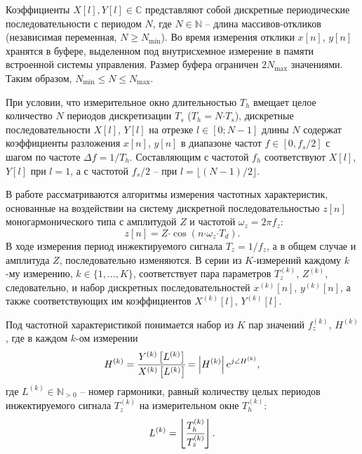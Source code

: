 Коэффициенты ${X\left[l\right], Y\left[l\right] \in \mathbb{C}}$ представляют собой дискретные периодические последовательности с периодом $N$, где ${N \in \mathbb{N}}$ -- длина массивов-откликов (независимая переменная, ${N \geq N_\text{min}}$). Во время измерения отклики ${x[n]}$, ${y[n]}$ хранятся в буфере, выделенном под внутрисхемное измерение в памяти встроенной системы управления. Размер буфера ограничен ${2N_\text{max}}$ значениями. Таким образом, ${N_\text{min}} \leq N \leq N_\text{max}$.

При условии, что измерительное окно длительностью ${T_{h}}$ вмещает целое количество $N$ периодов дискретизации ${T_{s}}$ (${T_{h} = N \mathord{\cdot} T_{s}}$), дискретные последовательности ${X\left[l\right]}$, ${Y\left[l\right]}$ на отрезке ${l \in \left[0; N - 1 \right]}$ длины $N$ содержат коэффициенты разложения ${x\left[n\right]}$, ${y\left[n\right]}$ в диапазоне частот ${f \in \left[0, f_{s} / 2\right]}$ с шагом по частоте ${\Delta f=1 / T_{h}}$. Составляющим с частотой ${f_{h}}$ соответствуют ${X\left[l\right]}$, ${Y\left[l\right]}$ при ${l = 1}$, а с частотой ${f_{s} / 2}$ -- при ${l = \bigl \lfloor (N - 1)/2 \bigr \rfloor}$.

В работе рассматриваются алгоритмы измерения частотных характеристик, основанные на воздействии на систему дискретной последовательностью ${z[n]}$ моногармонического типа с амплитудой ${Z}$ и частотой ${\omega_z = 2\pi f_z}$:
\begin{equation*}
    z[n] = Z \mathord{\cdot} \cos{(n \mathord{\cdot} \omega_z \mathord{\cdot} T_d)}.
\end{equation*}
В ходе измерения период инжектируемого сигнала ${T_z = 1 / f_z}$, а в общем случае и амплитуда $Z$, последовательно изменяются. В серии из $K$-измерений каждому $k$-му измерению, ${k \in \{1, \dots, K\}}$, соответствует пара параметров ${T^{(k)}_z}$, ${Z^{(k)}}$, следовательно, и набор дискретных последовательностей ${x^{(k)}[n]}$, ${y^{(k)}[n]}$, а также соответствующих им коэффициентов ${X^{(k)}\left[l\right]}$, ${Y^{(k)}\left[l\right]}$.

Под частотной характеристикой понимается набор из $K$ пар значений ${f^{(k)}_z}$, ${H^{(k)}}$, где в каждом $k$-ом измерении
\begin{equation}\label{eqn:complexFreqResp}
    H^{(k)} = \cfrac{Y^{(k)}\left[L^{(k)}\right]}{X^{(k)}\left[L^{(k)}\right]} = \left| H^{(k)} \right| e^{j \angle H^{(k)}},
\end{equation}
где ${L^{(k)} \in \mathbb{N}_{>0}}$ -- номер гармоники, равный количеству целых периодов инжектируемого сигнала ${{T^{(k)}_{z}}}$ на измерительном окне ${T^{(k)}_{h}}$:
\begin{equation*}
    L^{(k)} = \left\lfloor\cfrac{T^{(k)}_{h}}{T^{(k)}_{z}}\right\rfloor.
\end{equation*}

